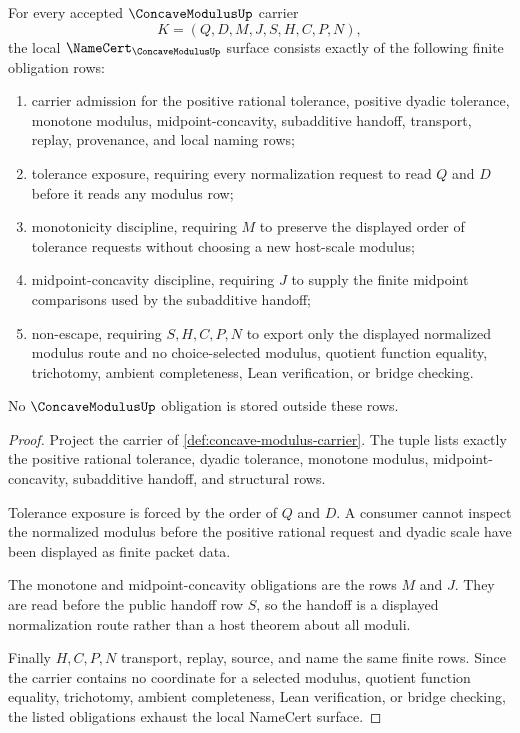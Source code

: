 \begin{theorem}
\label{thm:concave-modulus-namecert-obligations}
For every accepted $\ConcaveModulusUp$ carrier
$$
K=(Q,D,M,J,S,H,C,P,N),
$$
the local $\NameCert_{\ConcaveModulusUp}$ surface consists exactly of the following finite obligation rows:
\begin{enumerate}
\item carrier admission for the positive rational tolerance, positive dyadic tolerance, monotone modulus, midpoint-concavity, subadditive handoff, transport, replay, provenance, and local naming rows;
\item tolerance exposure, requiring every normalization request to read $Q$ and $D$ before it reads any modulus row;
\item monotonicity discipline, requiring $M$ to preserve the displayed order of tolerance requests without choosing a new host-scale modulus;
\item midpoint-concavity discipline, requiring $J$ to supply the finite midpoint comparisons used by the subadditive handoff;
\item non-escape, requiring $S,H,C,P,N$ to export only the displayed normalized modulus route and no choice-selected modulus, quotient function equality, trichotomy, ambient completeness, Lean verification, or bridge checking.
\end{enumerate}
No $\ConcaveModulusUp$ obligation is stored outside these rows.
\end{theorem}
\begin{proof}
Project the carrier of \autoref{def:concave-modulus-carrier}. The tuple lists exactly the positive rational tolerance, dyadic tolerance, monotone modulus, midpoint-concavity, subadditive handoff, and structural rows.

Tolerance exposure is forced by the order of $Q$ and $D$. A consumer cannot inspect the normalized modulus before the positive rational request and dyadic scale have been displayed as finite packet data.

The monotone and midpoint-concavity obligations are the rows $M$ and $J$. They are read before the public handoff row $S$, so the handoff is a displayed normalization route rather than a host theorem about all moduli.

Finally $H,C,P,N$ transport, replay, source, and name the same finite rows. Since the carrier contains no coordinate for a selected modulus, quotient function equality, trichotomy, ambient completeness, Lean verification, or bridge checking, the listed obligations exhaust the local NameCert surface.
\end{proof}

